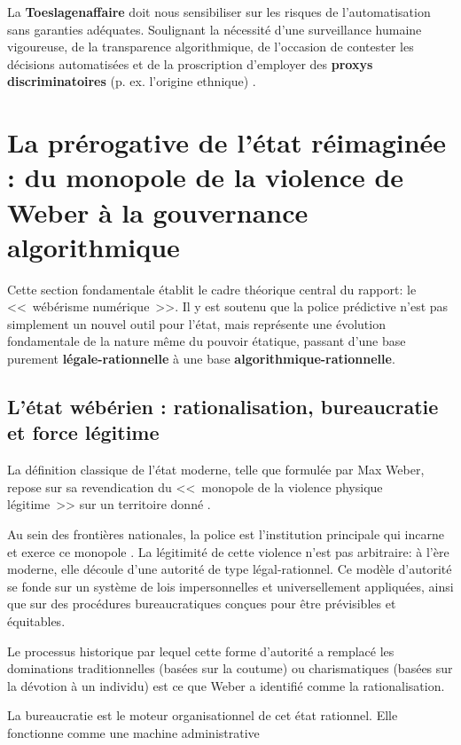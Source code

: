 La \textbf{Toeslagenaffaire} doit nous sensibiliser sur les risques de l'automatisation sans garanties adéquates. Soulignant la nécessité d'une surveillance humaine vigoureuse, de la transparence algorithmique, de l'occasion de contester les décisions automatisées et de la proscription d'employer des \textbf{proxys discriminatoires} (p. ex. l'origine ethnique) \citep{Heikkilä2023How, AmnestyInternational2021}.

\section{La prérogative de l'état réimaginée : du monopole de la violence de Weber à la gouvernance algorithmique}
\label{sec:prerogative}

Cette section fondamentale établit le cadre théorique central du rapport: le <<~wébérisme numérique~>>. Il y est soutenu que la police prédictive n'est pas simplement un nouvel outil pour l'état, mais représente une évolution fondamentale de la nature même du pouvoir étatique, passant d'une base purement \textbf{légale-rationnelle} à une base \textbf{algorithmique-rationnelle}.

\subsection{L'état wébérien : rationalisation, bureaucratie et force légitime}
\label{ssec:etat-weberien}

La définition classique de l'état moderne, telle que formulée par Max Weber, repose sur sa revendication du <<~monopole de la violence physique légitime~>> sur un territoire donné \citep{Weber1960Le, Weber2002Economy}.

Au sein des frontières nationales, la police est l'institution principale qui incarne et exerce ce monopole \citep{Brodeur2010The}. La légitimité de cette violence n'est pas arbitraire: à l'ère moderne, elle découle d'une autorité de type légal-rationnel. Ce modèle d'autorité se fonde sur un système de lois impersonnelles et universellement appliquées, ainsi que sur des procédures bureaucratiques conçues pour être prévisibles et équitables. 

Le processus historique par lequel cette forme d'autorité a remplacé les dominations traditionnelles (basées sur la coutume) ou charismatiques (basées sur la dévotion à un individu) est ce que Weber a identifié comme la rationalisation.

La bureaucratie est le moteur organisationnel de cet état rationnel. Elle fonctionne comme une machine administrative
